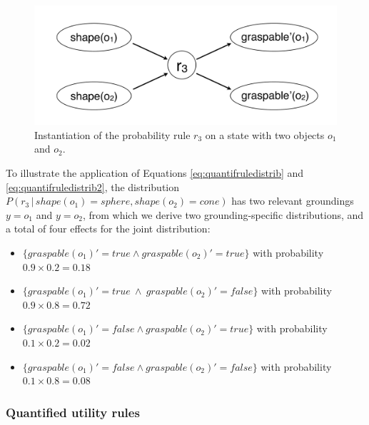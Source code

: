 \begin{figure}[ht]
\centering
\includegraphics[scale=0.25]{imgs/quantruleinstantiation.pdf}
\caption{Instantiation of the probability rule $r_3$ on a state with two objects $o_1$ and $o_2$.}
\label{fig:quantinstantitionprob}
\end{figure}

To illustrate the application of Equations \eqref{eq:quantifruledistrib} and \eqref{eq:quantifruledistrib2}, the distribution $P(r_3 \, | \, \mathit{shape}(o_1)\!=\!\mathit{sphere}, \mathit{shape}(o_2)\!=\!\mathit{cone})$ has two relevant groundings $y\!=\!o_1$ and $y\!=\!o_2$, from which we derive two grounding-specific distributions, and a total of four effects for the joint distribution:\vspace{-2mm}
\begin{itemize}
\item $\{\mathit{graspable}(o_1)'\!=\!true \land \mathit{graspable}(o_2)'\!=\!true \} $ with probability $0.9\times0.2\!=\!0.18$ \vspace{-2mm}
\item $\{\mathit{graspable}(o_1)'\!=\!true \ \land \  \mathit{graspable}(o_2)'\!=\!false\}$ with probability $0.9\times0.8\!=\!0.72$ \vspace{-2mm}
\item $\{ \mathit{graspable}(o_1)'\!=\!false \land \mathit{graspable}(o_2)'\!=\!true \}$ with probability $0.1\times0.2\!=\!0.02$ \vspace{-2mm}
\item $\{\mathit{graspable}(o_1)'\!=\!false \land \mathit{graspable}(o_2)'\!=\!false\}$ with probability $0.1\times0.8\!=\!0.08$
\end{itemize}


\subsubsection*{Quantified utility rules}


